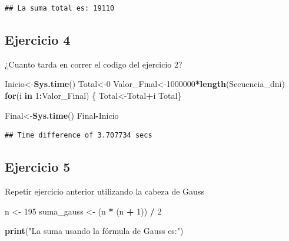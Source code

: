 \documentclass[]{llncs}
\newenvironment{Shaded}{\begin{snugshade}}{\end{snugshade}}
\newcommand{\ControlFlowTok}[1]{\textcolor[rgb]{0.13,0.29,0.53}{\textbf{#1}}}
\newcommand{\DecValTok}[1]{\textcolor[rgb]{0.00,0.00,0.81}{#1}}
\newcommand{\FunctionTok}[1]{\textcolor[rgb]{0.13,0.29,0.53}{\textbf{#1}}}
\newcommand{\NormalTok}[1]{#1}
\newcommand{\OtherTok}[1]{\textcolor[rgb]{0.56,0.35,0.01}{#1}}
\newcommand{\SpecialCharTok}[1]{\textcolor[rgb]{0.81,0.36,0.00}{\textbf{#1}}}
\newcommand{\StringTok}[1]{\textcolor[rgb]{0.31,0.60,0.02}{#1}}
\begin{document}
\begin{verbatim}
## La suma total es: 19110
\end{verbatim}

\subsection{Ejercicio 4}\label{ejercicio-4}

¿Cuanto tarda en correr el codigo del ejercicio 2?

\begin{Shaded}
\begin{Highlighting}[]
\NormalTok{Inicio}\OtherTok{\textless{}{-}}\FunctionTok{Sys.time}\NormalTok{()}
\NormalTok{Total}\OtherTok{\textless{}{-}}\DecValTok{0}
\NormalTok{Valor\_Final}\OtherTok{\textless{}{-}}\DecValTok{1000000}\SpecialCharTok{*}\FunctionTok{length}\NormalTok{(Secuencia\_dni)}
\ControlFlowTok{for}\NormalTok{(i }\ControlFlowTok{in} \DecValTok{1}\SpecialCharTok{:}\NormalTok{Valor\_Final) \{}
\NormalTok{  Total}\OtherTok{\textless{}{-}}\NormalTok{Total}\SpecialCharTok{+}\NormalTok{i}
\NormalTok{  Total\}}

\NormalTok{Final}\OtherTok{\textless{}{-}}\FunctionTok{Sys.time}\NormalTok{()}
\NormalTok{Final}\SpecialCharTok{{-}}\NormalTok{Inicio}
\end{Highlighting}
\end{Shaded}

\begin{verbatim}
## Time difference of 3.707734 secs
\end{verbatim}

\subsection{Ejercicio 5}\label{ejercicio-5}

Repetir ejercicio anterior utilizando la cabeza de Gauss

\begin{Shaded}
\begin{Highlighting}[]
\NormalTok{n }\OtherTok{\textless{}{-}} \DecValTok{195}
\NormalTok{suma\_gauss }\OtherTok{\textless{}{-}}\NormalTok{ (n }\SpecialCharTok{*}\NormalTok{ (n }\SpecialCharTok{+} \DecValTok{1}\NormalTok{)) }\SpecialCharTok{/} \DecValTok{2}

\FunctionTok{print}\NormalTok{(}\StringTok{"La suma usando la fórmula de Gauss es:"}\NormalTok{)}
\end{Highlighting}
\end{Shaded}
\end{document}
